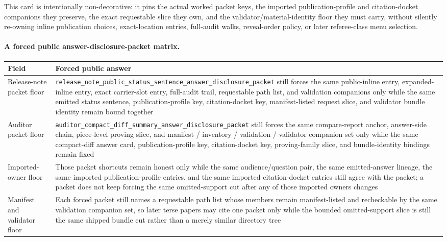 \documentclass[11pt]{article}
\begin{document}
This card is intentionally non-decorative: it pins the actual worked packet keys, the imported publication-profile and citation-docket companions they preserve, the exact requestable slice they own, and the validator/material-identity floor they must carry, without silently re-owning inline publication choices, exact-location entries, full-audit walks, reveal-order policy, or later referee-class menu selection.\cite{series:workedexample}

\paragraph{A forced public answer-disclosure-packet matrix.}
\begin{table}[t]
\centering
\small
\begin{tabularx}{\linewidth}{@{}lX@{}}
\toprule
Field & Forced public answer \\
\midrule
Release-note packet floor & \nolinkurl{release_note_public_status_sentence_answer_disclosure_packet} still forces the same public-inline entry, expanded-inline entry, exact carrier-slot entry, full-audit trail, requestable path list, and validation companions only while the same emitted status sentence, publication-profile key, citation-docket key, manifest-listed request slice, and validator bundle identity remain bound together \\
Auditor packet floor & \nolinkurl{auditor_compact_diff_summary_answer_disclosure_packet} still forces the same compare-report anchor, answer-side chain, piece-level proving slice, and manifest / inventory / validation / validator companion set only while the same compact-diff answer card, publication-profile key, citation-docket key, proving-family slice, and bundle-identity bindings remain fixed \\
Imported-owner floor & Those packet shortcuts remain honest only while the same audience/question pair, the same emitted-answer lineage, the same imported publication-profile entries, and the same imported citation-docket entries still agree with the packet; a packet does not keep forcing the same omitted-support cut after any of those imported owners changes \\
Manifest and validator floor & Each forced packet still names a requestable path list whose members remain manifest-listed and recheckable by the same validation companion set, so later terse papers may cite one packet only while the bounded omitted-support slice is still the same shipped bundle cut rather than a merely similar directory tree \\

\end{tabularx}
\end{table}
\end{document}
